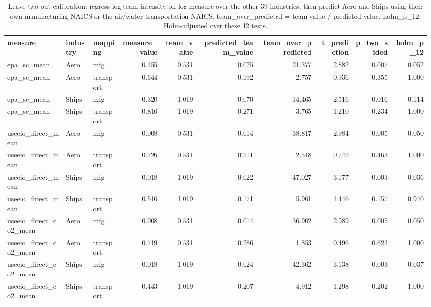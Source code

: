\begin{table}
\caption{Leave-two-out calibration: regress log team intensity on log measure over the other 39 industries, then predict Aero and Ships using their own manufacturing NAICS or the air/water transportation NAICS. team\_over\_predicted = team value / predicted value. holm\_p\_12: Holm-adjusted over these 12 tests.}
\label{tab:m4_calibration}
\begin{tabular}{lllrrrrrrr}
\toprule
measure & industry & mapping & measure\_value & team\_value & predicted\_team\_value & team\_over\_predicted & t\_prediction & p\_two\_sided & holm\_p\_12 \\
\midrule
epa\_sc\_mean & Aero & mfg & 0.155 & 0.531 & 0.025 & 21.377 & 2.882 & 0.007 & 0.052 \\
epa\_sc\_mean & Aero & transport & 0.644 & 0.531 & 0.192 & 2.757 & 0.936 & 0.355 & 1.000 \\
epa\_sc\_mean & Ships & mfg & 0.320 & 1.019 & 0.070 & 14.465 & 2.516 & 0.016 & 0.114 \\
epa\_sc\_mean & Ships & transport & 0.816 & 1.019 & 0.271 & 3.765 & 1.210 & 0.234 & 1.000 \\
useeio\_direct\_mean & Aero & mfg & 0.008 & 0.531 & 0.014 & 38.817 & 2.984 & 0.005 & 0.050 \\
useeio\_direct\_mean & Aero & transport & 0.726 & 0.531 & 0.211 & 2.518 & 0.742 & 0.463 & 1.000 \\
useeio\_direct\_mean & Ships & mfg & 0.018 & 1.019 & 0.022 & 47.027 & 3.177 & 0.003 & 0.036 \\
useeio\_direct\_mean & Ships & transport & 0.516 & 1.019 & 0.171 & 5.961 & 1.446 & 0.157 & 0.940 \\
useeio\_direct\_co2\_mean & Aero & mfg & 0.008 & 0.531 & 0.014 & 36.902 & 2.989 & 0.005 & 0.050 \\
useeio\_direct\_co2\_mean & Aero & transport & 0.719 & 0.531 & 0.286 & 1.853 & 0.496 & 0.623 & 1.000 \\
useeio\_direct\_co2\_mean & Ships & mfg & 0.018 & 1.019 & 0.024 & 42.362 & 3.138 & 0.003 & 0.037 \\
useeio\_direct\_co2\_mean & Ships & transport & 0.443 & 1.019 & 0.207 & 4.912 & 1.298 & 0.202 & 1.000 \\
\bottomrule
\end{tabular}
\end{table}
